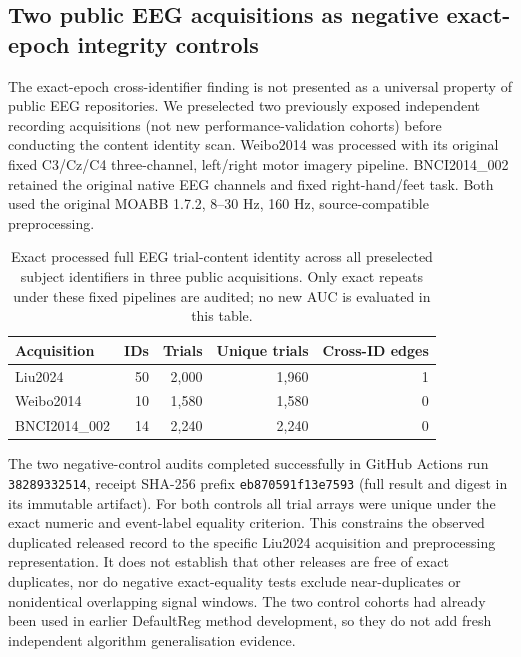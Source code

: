 \subsection{Two public EEG acquisitions as negative exact-epoch integrity controls}
\label{sec:v28-negative-acquisition-controls}
The exact-epoch cross-identifier finding is not presented
as a universal property of public EEG repositories.
We preselected two previously exposed independent
recording acquisitions (not new performance-validation
cohorts) before conducting the content identity scan.
Weibo2014 was processed with its original fixed
C3/Cz/C4 three-channel, left/right motor imagery
pipeline. BNCI2014\_002 retained the original native
EEG channels and fixed right-hand/feet task. Both
used the original MOABB 1.7.2, 8--30 Hz,
160 Hz, source-compatible preprocessing.

\begin{table}[tb]
\centering\small
\caption{Exact processed full EEG trial-content identity across
all preselected subject identifiers in three public acquisitions.
Only exact repeats under these fixed pipelines are audited;
no new AUC is evaluated in this table.}
\label{tab:v28-integrity-controls}
\begin{tabular}{lrrrr}
\toprule
Acquisition & IDs & Trials & Unique trials & Cross-ID edges\\
\midrule
Liu2024 & 50 & 2,000 & 1,960 & 1\\
Weibo2014 & 10 & 1,580 & 1,580 & 0\\
BNCI2014\_002 & 14 & 2,240 & 2,240 & 0\\
\bottomrule
\end{tabular}
\end{table}

The two negative-control audits completed successfully in
GitHub Actions run \texttt{38289332514},
receipt SHA-256 prefix \texttt{eb870591f13e7593}
(full result and digest in its immutable artifact).
For both controls all trial arrays were unique under
the exact numeric and event-label equality criterion.
This constrains the observed duplicated released
record to the specific Liu2024 acquisition and
preprocessing representation. It does not establish
that other releases are free of exact duplicates,
nor do negative exact-equality tests exclude near-duplicates
or nonidentical overlapping signal windows.
The two control cohorts had already been used
in earlier DefaultReg method development,
so they do not add fresh independent algorithm
generalisation evidence.
